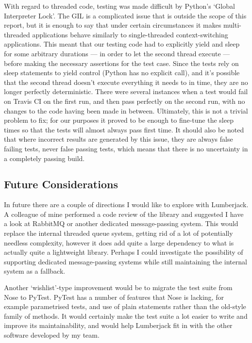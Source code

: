 \documentclass[a4paper,11pt]{article} %
\begin{document}
With regard to threaded code, testing was made difficult by Python's `Global
Interpreter Lock'.  The GIL is a complicated issue that is outside the scope of
this report, but it is enough to say that under certain circumstances it makes
multi-threaded applications behave similarly to single-threaded
context-switching applications.  This meant that our testing code had to
explicitly yield and sleep for some arbitrary durations --- in order to let the
second thread execute --- before making the necessary assertions for the test
case.  Since the tests rely on sleep statements to yield control (Python has no
explicit  call), and it's possible that the second thread doesn't
execute everything it needs to in time, they are no longer perfectly
deterministic.  There were several instances when a test would fail on Travis
CI on the first run, and then pass perfectly on the second run, with no changes
to the code having been made in between.  Ultimately, this is not a trivial
problem to fix; for our purposes it proved to be enough to fine-tune the sleep
times so that the tests will almost always pass first time.  It should also be
noted that where incorrect results are generated by this issue, they are always
false failing tests, never false passing tests, which means that there is no
uncertainty in a completely passing build.



\subsection{Future Considerations}
\label{sec:future}
In future there are a couple of directions I would like to explore with
Lumberjack.  A colleague of mine performed a code review of the library and
suggested I have a look at RabbitMQ or another dedicated message-passing
system.  This would replace the internal threaded queue system, getting rid of
a lot of potentially needless complexity, however it does add quite a large
dependency to what is actually quite a lightweight library.  Perhaps I could
investigate the possibility of supporting dedicated message-passing systems
while still maintaining the internal system as a fallback.

Another `wishlist'-type improvement would be to migrate the test suite from
Nose to PyTest.  PyTest has a number of features that Nose is lacking, for
example parametrised tests, and use of plain  statements rather
than the old-style  family of methods.  It would certainly
make the test suite a lot easier to write and improve its maintainability, and
would help Lumberjack fit in with the other software developed by my team.
\end{document}
